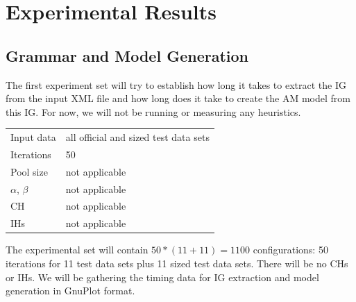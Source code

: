 \section{Experimental Results}

\subsection{Grammar and Model Generation}
\label{section-grammar-model-timing}


The first experiment set will try to establish how long it takes to extract the IG from the input XML file and how long does it take to create the AM model from this IG. For now, we will not be running or measuring any heuristics.

\begin{center}
\bigskip
\begin{tabular}{| l | l |}
  \hline
  \hline
  Input data        & all official and sized test data sets \\
  Iterations        & 50 \\
  Pool size         & not applicable \\
  $\alpha$, $\beta$ & not applicable \\
  CH                & not applicable \\
  IHs               & not applicable \\
  \hline
\end{tabular}
\bigskip
\end{center}

The experimental set will contain $50 * (11 + 11) = 1100$ configurations: 50 iterations for 11 test data sets plus 11 sized test data sets. There will be no CHs or IHs. We will be gathering the timing data for IG extraction and model generation in GnuPlot format.\\

